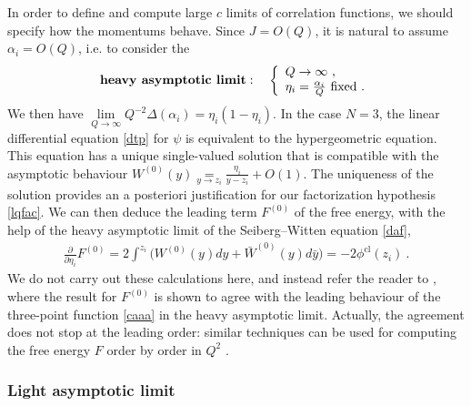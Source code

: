 \documentclass[12pt, a4paper, notitlepage, twoside]{report}
\numberwithin{equation}{section}
\theoremstyle{break}
\begin{document}
In order to define and compute large $c$ limits of correlation functions, we should specify how the momentums behave.
Since $J=O(Q)$, it is natural to assume $\alpha_i=O(Q)$, i.e. to consider the 
\begin{align}
 \textbf{\boldmath heavy\ asymptotic\ limit}\index{heavy\ asymptotic\ limit}: \quad \left\{\begin{array}{l}  Q \to \infty \ ,\\ \eta_i=\frac{\alpha_i}{Q}\ \text{fixed}\ .\end{array}\right.  
\end{align}
We then have $\underset{Q\to\infty}{\lim} Q^{-2}\Delta(\alpha_i)=\eta_i(1-\eta_i)$.
In the case $N=3$, the linear differential equation \eqref{dtp} for $\psi$ is equivalent to the hypergeometric equation.
This equation has a unique single-valued solution that is compatible with the asymptotic behaviour $W^{(0)}(y)\underset{y\to z_i}{=} \frac{\eta_i}{y-z_i} + O(1)$.
The uniqueness of the solution provides an a posteriori justification for our factorization hypothesis \eqref{lqfac}.
We can then deduce the leading term $F^{(0)}$ of the free energy, with the help of the heavy asymptotic limit of the Seiberg--Witten equation \eqref{daf}, 
\begin{align}
 {\frac{\partial}{\partial \eta_i}} F^{(0)} = 2\int^{z_i}\Big( W^{(0)}(y)dy + \bar W^{(0)}(y)d\bar y\Big) = -2\phi^\text{cl}(z_i)\ .
\end{align}
We do not carry out these calculations here, and instead refer the reader to \cite{zz95}, where the result for $F^{(0)}$ is shown to agree with the leading behaviour of the three-point function \eqref{caaa} in the heavy asymptotic limit.
Actually, the agreement does not stop at the leading order: similar techniques can be used for computing the free energy $F$ order by order in $Q^2$ \cite{cer12}.

\subsubsection{Light asymptotic limit}
\end{document}
